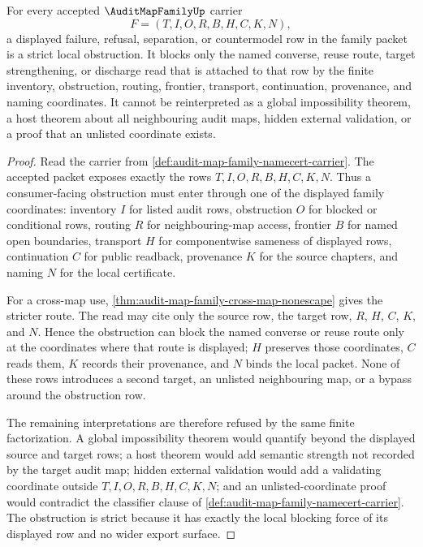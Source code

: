 \begin{corollary}
\label{cor:audit-map-family-strict-local-obstruction}
For every accepted $\AuditMapFamilyUp$ carrier
$$
F=(T,I,O,R,B,H,C,K,N),
$$
a displayed failure, refusal, separation, or countermodel row in the family packet is a strict local obstruction. It blocks only the named converse, reuse route, target strengthening, or discharge read that is attached to that row by the finite inventory, obstruction, routing, frontier, transport, continuation, provenance, and naming coordinates. It cannot be reinterpreted as a global impossibility theorem, a host theorem about all neighbouring audit maps, hidden external validation, or a proof that an unlisted coordinate exists.
\end{corollary}
\begin{proof}
Read the carrier from \autoref{def:audit-map-family-namecert-carrier}. The accepted packet exposes exactly the rows $T,I,O,R,B,H,C,K,N$. Thus a consumer-facing obstruction must enter through one of the displayed family coordinates: inventory $I$ for listed audit rows, obstruction $O$ for blocked or conditional rows, routing $R$ for neighbouring-map access, frontier $B$ for named open boundaries, transport $H$ for componentwise sameness of displayed rows, continuation $C$ for public readback, provenance $K$ for the source chapters, and naming $N$ for the local certificate.

For a cross-map use, \autoref{thm:audit-map-family-cross-map-nonescape} gives the stricter route. The read may cite only the source row, the target row, $R$, $H$, $C$, $K$, and $N$. Hence the obstruction can block the named converse or reuse route only at the coordinates where that route is displayed; $H$ preserves those coordinates, $C$ reads them, $K$ records their provenance, and $N$ binds the local packet. None of these rows introduces a second target, an unlisted neighbouring map, or a bypass around the obstruction row.

The remaining interpretations are therefore refused by the same finite factorization. A global impossibility theorem would quantify beyond the displayed source and target rows; a host theorem would add semantic strength not recorded by the target audit map; hidden external validation would add a validating coordinate outside $T,I,O,R,B,H,C,K,N$; and an unlisted-coordinate proof would contradict the classifier clause of \autoref{def:audit-map-family-namecert-carrier}. The obstruction is strict because it has exactly the local blocking force of its displayed row and no wider export surface.
\end{proof}

